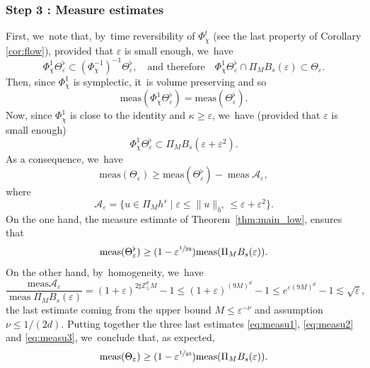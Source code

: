 \documentclass[JEP,XML,SOM,Unicode,published]{cedram}
\theoremstyle{plain}
\theoremstyle{definition}
\DeclareMathOperator{\meas}{meas}
\newcommand{\1}{\mathbf{1}}
\let\epsilon\varepsilon
\begin{document}
\subsubsection*{Step 3 : Measure estimates}
First, we~note that, by~time reversibility of $\Phi_\chi^{t}$ (see the last property of Corollary \ref{cor:flow}), provided that $\varepsilon$ is small enough, we~have\vspace*{-3pt}
\[
\Phi_\chi^{1} \Theta_\varepsilon^\flat \subset (\Phi_\chi^{-1})^{-1} \Theta_\varepsilon^\flat,\quad\text{and therefore}\quad\Phi_{\chi}^{1}\Theta_{\epsilon}^{\flat}\cap \Pi_{M}B_{s}(\epsilon)\subset \Theta_{\epsilon}.
\]
Then, since $\Phi_\chi^{1} $ is symplectic, it~is volume preserving and so\vspace*{-3pt}
\[
\mathrm{meas} (\Phi_\chi^{1} \Theta_\varepsilon^\flat) = \mathrm{meas} (\Theta_\varepsilon^\flat).
\]
Now, since $\Phi_\chi^{1}$ is close to the identity and $\kappa \geq \varepsilon$, we~have (provided that $\varepsilon$ is small enough)\vspace*{-3pt}
\[
\Phi_\chi^{1} \Theta_\varepsilon^\flat \subset \Pi_M B_s(\varepsilon + \varepsilon^2).
\]
As a consequence, we~have\vspace*{-3pt}
\begin{equation}
\label{eq:measu1}
\mathrm{meas} (\Theta_\varepsilon) \geq \mathrm{meas} (\Theta_\varepsilon^{\flat}) -\meas \mathcal{A}_\varepsilon,
\end{equation}
where\vspace*{-3pt}
\[
\mathcal{A}_\varepsilon = \{ u\in \Pi_M h^s \mid \varepsilon \leq \| u\|_{h^s} \leq \varepsilon+ \varepsilon^2 \}.
\]
On the one hand, the measure estimate of Theorem~\ref{thm:main_low}, ensures that\vspace*{-3pt}
\begin{equation}
\label{eq:measu2}
\mathrm{meas}(\Theta_{\varepsilon}^\flat) \geq (1 - \varepsilon^{\sfrac{1}{39}})\mathrm{meas}(\Pi_{M} B_s(\varepsilon)).
\end{equation}
On the other hand, by~homogeneity, we~have\vspace*{-3pt}
\begin{equation}
\label{eq:measu3}
\frac{\mathrm{meas} \mathcal{A}_\varepsilon}{\meas \Pi_M B_s(\varepsilon)} = (1+ \varepsilon)^{2\sharp \mathbb{Z}^d_\leq M} - 1 \leq (1+ \varepsilon)^{(9M)^d} -1 \leq e^{\varepsilon (9M)^d} - 1 \lesssim \sqrt{\varepsilon},
\end{equation}
the last estimate coming from the upper bound $M\leq \varepsilon^{-\nu}$ and assumption $\nu \leq 1/(2d)$. Putting together the three last estimates \eqref{eq:measu1}, \eqref{eq:measu2} and \eqref{eq:measu3}, we~conclude that, as expected,\vspace*{-3pt}
\[
\mathrm{meas}(\Theta_{\varepsilon}) \geq (1 - \varepsilon^{\sfrac{1}{40}})\mathrm{meas}(\Pi_{M} B_s(\varepsilon)).
\]
\end{document}
